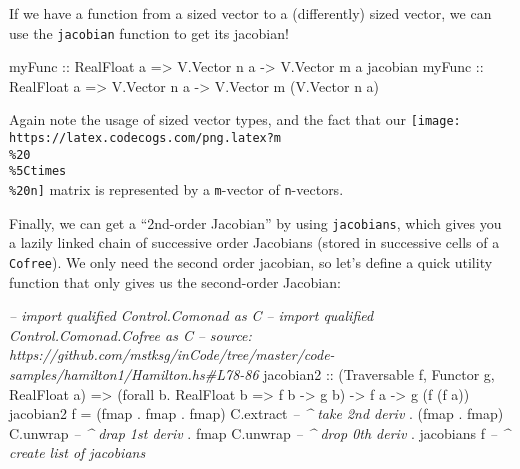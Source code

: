 \documentclass[]{article}
\newenvironment{Shaded}{}{}
\newcommand{\DataTypeTok}[1]{\textcolor[rgb]{0.56,0.13,0.00}{#1}}
\newcommand{\CommentTok}[1]{\textcolor[rgb]{0.38,0.63,0.69}{\textit{#1}}}
\newcommand{\OtherTok}[1]{\textcolor[rgb]{0.00,0.44,0.13}{#1}}
\newcommand{\FunctionTok}[1]{\textcolor[rgb]{0.02,0.16,0.49}{#1}}
\newcommand{\NormalTok}[1]{#1}
\begin{document}
If we have a function from a sized vector to a (differently) sized vector, we
can use the \texttt{jacobian} function to get its jacobian!

\begin{Shaded}
\begin{Highlighting}[]
\OtherTok{myFunc          ::} \DataTypeTok{RealFloat}\NormalTok{ a }\OtherTok{=>} \DataTypeTok{V.Vector}\NormalTok{ n a }\OtherTok{->} \DataTypeTok{V.Vector}\NormalTok{ m a}
\NormalTok{jacobian}\OtherTok{ myFunc ::} \DataTypeTok{RealFloat}\NormalTok{ a }\OtherTok{=>} \DataTypeTok{V.Vector}\NormalTok{ n a }\OtherTok{->} \DataTypeTok{V.Vector}\NormalTok{ m (}\DataTypeTok{V.Vector}\NormalTok{ n a)}
\end{Highlighting}
\end{Shaded}

Again note the usage of sized vector types, and the fact that our
\texttt{[image: https://latex.codecogs.com/png.latex?m\\\%20\\\%5Ctimes\\\%20n]}
matrix is represented by a \texttt{m}-vector of \texttt{n}-vectors.

Finally, we can get a ``2nd-order Jacobian'' by using \texttt{jacobians}, which
gives you a lazily linked chain of successive order Jacobians (stored in
successive cells of a \texttt{Cofree}). We only need the second order jacobian,
so let's define a quick utility function that only gives us the second-order
Jacobian:

\begin{Shaded}
\begin{Highlighting}[]
\CommentTok{-- import qualified Control.Comonad        as C}
\CommentTok{-- import qualified Control.Comonad.Cofree as C}
\CommentTok{-- source: https://github.com/mstksg/inCode/tree/master/code-samples/hamilton1/Hamilton.hs#L78-86}
\NormalTok{jacobian2}
\OtherTok{    ::}\NormalTok{ (}\DataTypeTok{Traversable}\NormalTok{ f, }\DataTypeTok{Functor}\NormalTok{ g, }\DataTypeTok{RealFloat}\NormalTok{ a)}
    \OtherTok{=>}\NormalTok{ (forall b}\FunctionTok{.} \DataTypeTok{RealFloat}\NormalTok{ b }\OtherTok{=>}\NormalTok{ f b }\OtherTok{->}\NormalTok{ g b)}
    \OtherTok{->}\NormalTok{ f a}
    \OtherTok{->}\NormalTok{ g (f (f a))}
\NormalTok{jacobian2 f }\FunctionTok{=}\NormalTok{ (fmap }\FunctionTok{.}\NormalTok{ fmap }\FunctionTok{.}\NormalTok{ fmap) C.extract  }\CommentTok{-- ^ take 2nd deriv}
            \FunctionTok{.}\NormalTok{ (fmap }\FunctionTok{.}\NormalTok{ fmap) C.unwrap          }\CommentTok{-- ^ drap 1st deriv}
            \FunctionTok{.}\NormalTok{ fmap C.unwrap                   }\CommentTok{-- ^ drop 0th deriv}
            \FunctionTok{.}\NormalTok{ jacobians f                     }\CommentTok{-- ^ create list of jacobians}
\end{Highlighting}
\end{Shaded}
\end{document}
